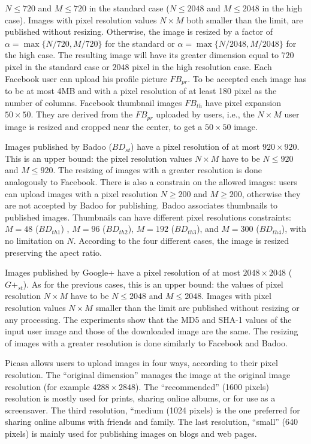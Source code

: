 \documentclass[10pt, conference]{IEEEtran}
\begin{document}
$N\leq 720$ and $M\leq 720$ in the standard case 
($N\leq 2048 $ and $M\leq 2048 $ in the high case).
Images with pixel resolution values $N\times M$ both smaller than
the limit, are published without resizing.
Otherwise, the image is resized by a factor of $\alpha=\max \{N/720,
M/720\}$ for the standard or $\alpha=\max \{N/2048, M/2048\}$ for the high
case. The resulting image will have its greater dimension equal to $720$
pixel in the standard case or $2048$ pixel in the high resolution case.
Each Facebook user can upload his profile picture $FB_{pr}$. To be accepted each
image has to be at most 4MB and with a pixel resolution of at least 180
pixel as the number of columns. 
Facebook thumbnail images $FB_{th}$ have pixel expansion $50\times 50$. They are
derived from the $FB_{pr}$ uploaded by users, i.e., the $N\times
M$ user image is resized and cropped near the center, to get a $50\times
50$ image.

Images published by Badoo ($BD_{st}$) have a pixel resolution of at most $920\times 920$.
This is an upper bound: the pixel resolution values $N\times M$ have to
be $N\leq 920$ and $M\leq 920$. The resizing of images with a greater
resolution is done analogously to Facebook. 
There is also a constrain on the allowed images: users can upload images with a pixel 
resolution $N\geq 200$ and $M\geq 200$, otherwise they are not accepted by Badoo for publishing.
Badoo associates thumbnails to published images. Thumbnails can have
different pixel resolutions constraints: $M=48$ ($BD_{th1}$) , $M=96$ ($BD_{th2}$), 
$M=192$ ($BD_{th3}$), and $M=300$ ($BD_{th4}$), with no limitation on $N$. 
According to the four different cases, the image is resized preserving the apect ratio.

Images published by Google+ have a pixel resolution of at most $2048\times
2048$ ($G+_{st}$). As for the previous cases, this is an upper bound: the values of
pixel resolution $N\times M$ have to be $N\leq 2048$ and $M\leq 2048$. 
Images with pixel resolution values $N\times M$ smaller than
the limit are published without resizing or any processing. The experiments 
show that the MD5 and SHA-1 values of the input user image and those of the downloaded
image are the same. The resizing of images with a greater resolution is done similarly to
Facebook and Badoo.

Picasa allows users to upload images in four ways, according to their pixel resolution.
The ``original dimension'' manages the image at the original image resolution (for example $4288\times 2848$). The ``recommended'' (1600 pixels) resolution is mostly used for prints, sharing online albums, or for use as a screensaver. The third resolution, ``medium (1024 pixels) is the one preferred for sharing online albums with friends and family. The last resolution, ``small'' (640 pixels) is mainly used for publishing images on blogs and web pages.
\end{document}
